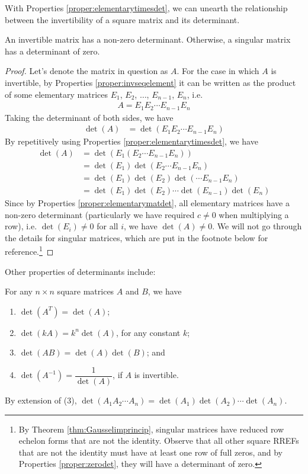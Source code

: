 With Properties \ref{proper:elementarytimesdet}, we can unearth the relationship between the invertibility of a square matrix and its determinant.
\begin{proper}
\label{proper:invnonzerodet}
An invertible matrix has a non-zero determinant. Otherwise, a singular matrix has a determinant of zero.
\end{proper}
\begin{proof}
Let's denote the matrix in question as $A$. For the case in which $A$ is invertible, by Properties \ref{proper:invseqelement} it can be written as the product of some elementary matrices $E_1$, $E_2$, $\ldots$, $E_{n-1}$, $E_n$, i.e.\
\begin{align*}
A = E_{1}E_{2} \cdots E_{n-1}E_n
\end{align*}
Taking the determinant of both sides, we have
\begin{align*}
\det(A) &= \det(E_{1}E_{2} \cdots E_{n-1}E_n)
\end{align*}
By repetitively using Properties \ref{proper:elementarytimesdet}, we have
\begin{align*}
\det(A) &= \det(E_{1}(E_{2} \cdots E_{n-1}E_n)) \\
&= \det(E_1) \det(E_{2} \cdots E_{n-1}E_n) \\
&= \det(E_1) \det(E_{2}) \det(\cdots E_{n-1}E_n) \\
&= \det(E_1) \det(E_{2}) \cdots \det(E_{n-1})\det(E_n)
\end{align*}
Since by Properties \ref{proper:elementarymatdet}, all elementary matrices have a non-zero determinant (particularly we have required $c \neq 0$ when multiplying a row), i.e. $\det(E_i) \neq 0$ for all $i$, we have $\det(A) \neq 0$. We will not go through the details for singular matrices, which are put in the footnote below for reference.\footnote{By Theorem \ref{thm:Gausselimprincip}, singular matrices have reduced row echelon forms that are not the identity. Observe that all other square RREFs that are not the identity must have at least one row of full zeros, and by Properties \ref{proper:zerodet}, they will have a determinant of zero.} 
\end{proof}
Other properties of determinants include:
\begin{proper}
\label{proper:properdet}
For any $n \times n$ square matrices $A$ and $B$, we have
\begin{enumerate}
\item $\det(A^T) = \det(A)$;
\item $\det(kA) = k^n \det(A)$, for any constant $k$;
\item $\det(AB) = \det(A)\det(B)$; and
\item $\det(A^{-1}) = \dfrac{1}{\det(A)}$, if $A$ is invertible.
\end{enumerate}
By extension of (3), $\det(A_1A_2\cdots A_n) = \det(A_1)\det(A_2)\cdots\det(A_n)$.
\end{proper}
